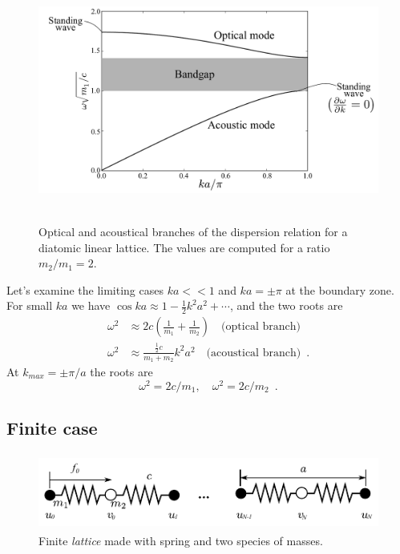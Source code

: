 \documentclass[12pt,letterpaper]{article}
\begin{document}
\begin{figure}[h]
\centering
\includegraphics[height=8cm]{img/diatomic-plot.pdf} 
\caption{Optical and acoustical branches of the dispersion relation for a diatomic linear lattice. The values are computed for a ratio $m_2/m_1 = 2$.}
\label{fig:diatomic_dispersion}
\end{figure}
Let's examine the limiting cases $ka<<1$ and $ka=\pm \pi$ at the boundary zone. For small $ka$ we have $\cos ka \approx 1 - \frac{1}{2}k^2a^2 + \cdots$, and the two roots are
\begin{align}
\omega^2 &\approx 2c\left(\frac{1}{m_1} + \frac{1}{m_2}\right)\quad \mbox{(optical branch)}\\
\omega^2 &\approx \frac{\frac{1}{2}c}{m_1+m_2}k^2a^2\quad \mbox{(acoustical branch)} \enspace  .
\end{align}
At $k_{max}=\pm\pi/a$ the roots are
\[\omega^2 = 2c/m_1,\quad \omega^2 = 2c/m_2 \enspace .\]

\subsection{Finite case}
\begin{figure}[h]
\centering
\includegraphics[height=2.5cm]{img/diatomic-finite.pdf} 
\caption{Finite \emph{lattice} made with spring and two species of masses.}
\label{fig:diatomic-finite}
\end{figure}
\end{document}
